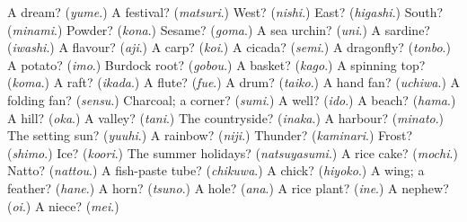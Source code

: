 \begin{tcolorbox}[breakable,colback=teal!4,colframe=teal!35!black,title={Before you move on}]
A dream? (\emph{yume}.) A festival? (\emph{matsuri}.) West? (\emph{nishi}.) East? (\emph{higashi}.) South? (\emph{minami}.) Powder? (\emph{kona}.) Sesame? (\emph{goma}.) A sea urchin? (\emph{uni}.) A sardine? (\emph{iwashi}.) A flavour? (\emph{aji}.) A carp? (\emph{koi}.) A cicada? (\emph{semi}.) A dragonfly? (\emph{tonbo}.) A potato? (\emph{imo}.) Burdock root? (\emph{gobou}.) A basket? (\emph{kago}.) A spinning top? (\emph{koma}.) A raft? (\emph{ikada}.) A flute? (\emph{fue}.) A drum? (\emph{taiko}.) A hand fan? (\emph{uchiwa}.) A folding fan? (\emph{sensu}.) Charcoal; a corner? (\emph{sumi}.) A well? (\emph{ido}.) A beach? (\emph{hama}.) A hill? (\emph{oka}.) A valley? (\emph{tani}.) The countryside? (\emph{inaka}.) A harbour? (\emph{minato}.) The setting sun? (\emph{yuuhi}.) A rainbow? (\emph{niji}.) Thunder? (\emph{kaminari}.) Frost? (\emph{shimo}.) Ice? (\emph{koori}.) The summer holidays? (\emph{natsuyasumi}.) A rice cake? (\emph{mochi}.) Natto? (\emph{nattou}.) A fish-paste tube? (\emph{chikuwa}.) A chick? (\emph{hiyoko}.) A wing; a feather? (\emph{hane}.) A horn? (\emph{tsuno}.) A hole? (\emph{ana}.) A rice plant? (\emph{ine}.) A nephew? (\emph{oi}.) A niece? (\emph{mei}.)
\end{tcolorbox}
